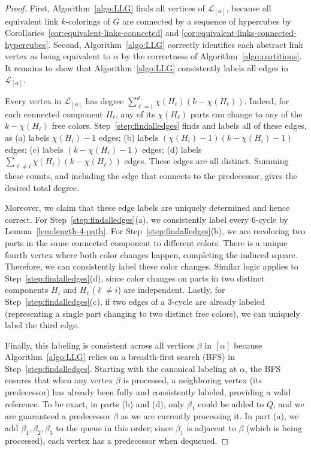 \documentclass{amsart}
\theoremstyle{hypothesisstyle}
\theoremstyle{definition}
\theoremstyle{remark}
\numberwithin{equation}{section}
\begin{document}
\begin{proof}
First, Algorithm~\ref{algo:LLG} finds all vertices of $\mathcal{L}_{[\alpha]}$, because all equivalent link $k$-colorings of $G$ are connected by a sequence of hypercubes by Corollaries~\ref{cor:equivalent-links-connected} and \ref{cor:equivalent-links-connected-hypercubes}. Second, Algorithm~\ref{algo:LLG}  correctly identifies each abstract link vertex as being equivalent to $\alpha$ by the correctness of Algorithm~\ref{algo:partitions}. It remains to show that Algorithm~\ref{algo:LLG} consistently labels all edges in $\mathcal{L}_{[\alpha]}$.

Every vertex in $\mathcal{L}_{[\alpha]}$ has degree $\sum_{\ell=1}^d\chi(H_{\ell})(k-\chi(H_{\ell}))$. Indeed, for each connected component $H_{\ell}$, any of its $\chi(H_{\ell})$ parts can change to any of the $k-\chi(H_{\ell})$ free colors. Step~\ref{step:findalledges} finds and labels all of these edges, as (a) labels $\chi(H_i)-1$ edges; (b) labels $(\chi(H_i)-1)(k-\chi(H_i)-1)$ edges; (c) labels $(k-\chi(H_i)-1)$ edges; (d) labels $\sum_{\ell\neq i}\chi(H_{\ell})(k-\chi(H_{\ell}))$ edges.  These edges are all distinct. Summing these counts, and including the edge that connects to the predecessor, gives the desired total degree.

Moreover, we claim that these edge labels are uniquely determined and hence correct. For Step~\ref{step:findalledges}(a), we consistently label every 6-cycle by Lemma~\ref{lem:length-4-path}.  For Step~\ref{step:findalledges}(b), we are recoloring two parts in the same connected component to different colors. There is a unique fourth vertex where both color changes happen, completing the induced square.  Therefore, we can consistently label these color changes.  Similar logic applies to Step~\ref{step:findalledges}(d), since color changes on parts in two distinct components $H_i$ and $H_{\ell}$ ($\ell\neq i$) are independent. Lastly, for Step~\ref{step:findalledges}(c), if two edges of a $3$-cycle are already labeled (representing a single part changing to two distinct free colors), we can uniquely label the third edge.

Finally, this labeling is consistent across all vertices $\beta$ in $[\alpha]$ because Algorithm~\ref{algo:LLG} relies on a breadth-first search (BFS) in Step~\ref{step:findalledges}. Starting with the canonical labeling at $\alpha$, the BFS ensures that when any vertex $\beta$ is processed, a neighboring vertex (its predecessor) has already been fully and consistently labeled, providing a valid reference.  To be exact, in parts (b) and (d), only $\beta_1$ could be added to $Q$, and we are guaranteed a predecessor $\beta$ as we are currently processing it. In part (a), we add $\beta_1,\beta_2,\beta_3$ to the queue in this order; since $\beta_1$ is adjacent to $\beta$ (which is being processed), each vertex has a predecessor when dequeued. \end{proof}
\end{document}
